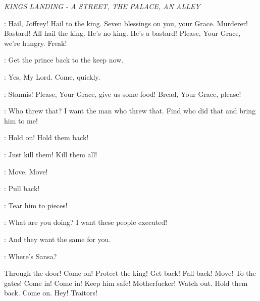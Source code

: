 \scene

\textit{KINGS LANDING - A STREET, THE PALACE, AN ALLEY} 


\CROWD: Hail, Joffrey! 
Hail to the king. 
Seven blessings on you, your Grace. 
Murderer! 
Bastard! 
All hail the king. 
He's no king. He's a bastard! 
Please, Your Grace, we're hungry.  
Freak! 

\TYRION: Get the prince  back to the keep now. 

\LANNISTERGUARD: Yes, My Lord. Come, quickly. 

\CROWD: Stannis!
Please, Your Grace, give us some food!
Bread, Your Grace, please! 


\JOFFREY: Who threw that? I want the man who threw that. Find who did that and bring him to me! 


\GUARD: Hold on! Hold them back! 

\JOFFREY: Just kill them! Kill them all! 


\TYRION: Move. Move! 

\GUARD: Pull back! 

\CROWD: Tear him to pieces!


\JOFFREY: What are you doing? I want these people executed! 

\HOUND: And they want the same for you.


\TYRION: Where's Sansa? 


Through the door! 
Come on! 
Protect the king! 
Get back! 
Fall back! 
Move! 
To the gates! 
Come in! Come in! 
Keep him safe! 
Motherfucker! 
Watch out. Hold them back. 
Come on. 
Hey! 
Traitors! 

